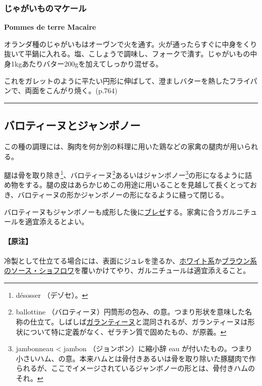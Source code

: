 \begin{recette}
{\subsubsection{じゃがいものマケール}\label{pommes-de-terre-macaire}}

\begin{spacing}{0.2}\bfseries Pommes de terre Macaire\end{spacing}\normalfont\normalsize\setlength{\leftskip}{0pt}\par\vspace{1.1\zw}


オランダ種のじゃがいもはオーヴンで火を通す。火が通ったらすぐに中身をくり抜いて平鍋に入れる。塩、こしょうで調味し、フォークで潰す。じゃがいもの中身1kgあたりバター200gを加えてしっかり混ぜる。

これをガレットのように平たい円形に伸ばして、澄ましバターを熱したフライパンで、両面をこんがり焼く。(p.764)
\end{recette}
\begin{center}\rule{0.5\linewidth}{\linethickness}\end{center}

\hypertarget{ballottines-et-jambonneaux}{%
\subsection{バロティーヌとジャンボノー}\label{ballottines-et-jambonneaux}}

この種の調理には、胸肉を何か別の料理に用いた鶏などの家禽の腿肉が用いられる。

腿は骨を取り除き\footnote{désosser （デゾセ）。}、バロティーヌ\footnote{ballottine
  （バロティーヌ）円筒形の包み、の意。つまり形状を意味した名称の仕立て。しばしば\protect\hyperlink{galantine-type}{ガランティーヌ}と混同されるが、ガランティーヌは形状について特に定義がなく、ゼラチン質で固めたもの、が原義。}あるいはジャンボノー\footnote{jambonneau
  \textless{} jambon （ジョンボン）に縮小辞 eau
  が付いたもの。つまり小さいハム、の意。本来ハムとは骨付きあるいは骨を取り除いた豚腿肉で作られるが、ここでイメージされているジャンボノーの形とは、骨付きハムのそれ。}の形になるように詰め物をする。腿の皮はあらかじめこの用途に用いることを見越して長くとっておき、バロティーヌの形かジャンボノーの形になるように縫って閉じる。

バロティーヌもジャンボノーも成形した後に\protect\hyperlink{les-braises-de-viandes-blanches}{ブレゼ}する。家禽に合うガルニチュールを適宜添えるとよい。

\hypertarget{ux539fux6ce8}{%
\paragraph{【原注】}\label{ux539fux6ce8}}

冷製として仕立てる場合には、表面にジュレを塗るか、\protect\hyperlink{sauce-chaud-froid-blanche-ordinaire}{ホワイト系}か\protect\hyperlink{sauce-chaud-froid-brune}{ブラウン系のソース・ショフロワ}を覆いかけてやり、ガルニチュールは適宜添えること。
